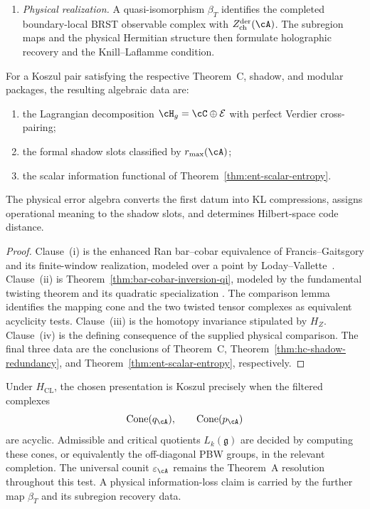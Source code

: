 \begin{theorem}
\begin{enumerate}[label=\textup{(\roman*)}]
\item \emph{Physical realization.}
A quasi-isomorphism $\beta_T$ identifies the completed
boundary-local BRST observable complex with
$Z^{\mathrm{der}}_{\mathrm{ch}}(\cA)$.  The subregion maps and the
physical Hermitian structure then formulate holographic recovery and
the Knill--Laflamme condition.
\end{enumerate}

For a Koszul pair satisfying the respective Theorem~C, shadow, and
modular packages, the resulting algebraic data are:
\begin{enumerate}[label=\textup{(\alph*)}]
\item the Lagrangian decomposition
$\cH_g=\cC\oplus\mathcal E$ with perfect Verdier cross-pairing;
\item the formal shadow slots classified by $r_{\max}(\cA)$;
\item the scalar information functional of
Theorem~\ref{thm:ent-scalar-entropy}.
\end{enumerate}
The physical error algebra converts the first datum into KL
compressions, assigns operational meaning to the shadow slots, and
determines Hilbert-space code distance.
\end{theorem}

\begin{proof}
Clause~\textup{(i)} is the enhanced Ran bar--cobar equivalence of
Francis--Gaitsgory and its finite-window realization, modeled over a
point by Loday--Vallette~\cite[Corollary~2.3.4]{LodayVallette12}.
Clause~\textup{(ii)} is
Theorem~\ref{thm:bar-cobar-inversion-qi}, modeled by the fundamental
twisting theorem and its quadratic specialization
\cite[Theorems~2.3.2 and~3.4.6]{LodayVallette12}.  The comparison
lemma identifies the mapping cone and the two twisted tensor
complexes as equivalent acyclicity tests.  Clause~\textup{(iii)} is
the homotopy invariance stipulated by $H_Z$.  Clause~\textup{(iv)} is
the defining consequence of the supplied physical comparison.
The final three data are the conclusions of Theorem~C,
Theorem~\ref{thm:hc-shadow-redundancy}, and
Theorem~\ref{thm:ent-scalar-entropy}, respectively.
\end{proof}

\begin{remark}
\label{rem:hc-non-koszul-failure}
Under $H_{\mathrm{CL}}$, the chosen presentation is Koszul precisely
when the filtered complexes
\[
\operatorname{Cone}(q_\cA),\qquad
\operatorname{Cone}(p_\cA)
\]
are acyclic.  Admissible and critical quotients
$L_k(\mathfrak g)$ are decided by computing these cones, or
equivalently the off-diagonal PBW groups, in the relevant completion.
The universal counit $\varepsilon_\cA$ remains the Theorem~A
resolution throughout this test.  A physical information-loss claim
is carried by the further map $\beta_T$ and its subregion recovery
data.
\end{remark}

